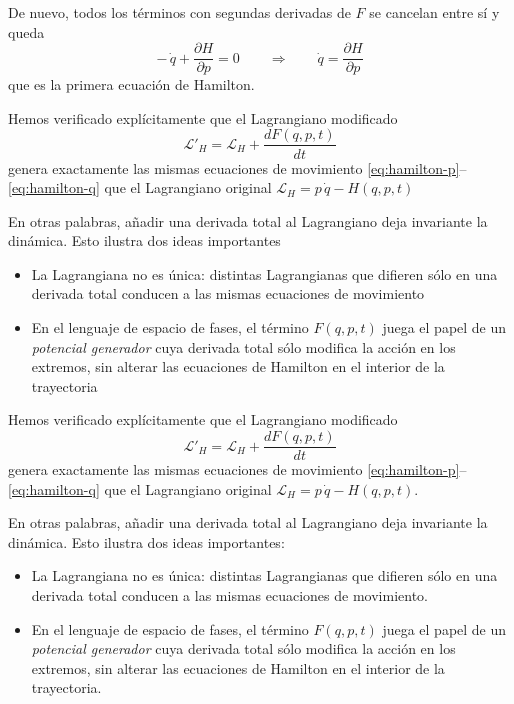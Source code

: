 \documentclass{article}
\begin{document}
De nuevo, todos los términos con segundas derivadas de $F$ se cancelan entre sí
y queda
\begin{equation}
  -\,\dot q + \frac{\partial H}{\partial p} = 0
  \qquad\Rightarrow\qquad
  \dot q = \frac{\partial H}{\partial p}
  \label{eq:hamilton-q}
\end{equation}
que es la primera ecuación de Hamilton.



Hemos verificado explícitamente que el Lagrangiano modificado
\begin{equation}
  \mathcal{L}'_{H}
  = \mathcal{L}_{H}
  + \frac{dF(q,p,t)}{dt}
\end{equation}
genera exactamente las mismas ecuaciones de movimiento
\eqref{eq:hamilton-p}–\eqref{eq:hamilton-q} que el Lagrangiano original
$\mathcal{L}_{H} = p\,\dot q - H(q,p,t)$

En otras palabras, añadir una derivada total al Lagrangiano deja invariante
la dinámica. Esto ilustra dos ideas importantes

\begin{itemize}
  \item[$\bullet$] La Lagrangiana no es única: distintas Lagrangianas que difieren sólo en
        una derivada total conducen a las mismas ecuaciones de movimiento

  \item[$\bullet$] En el lenguaje de espacio de fases, el término $F(q,p,t)$ juega el
        papel de un \emph{potencial generador} cuya derivada total sólo modifica
        la acción en los extremos, sin alterar las ecuaciones de Hamilton en el
        interior de la trayectoria
\end{itemize}

Hemos verificado explícitamente que el Lagrangiano modificado
\begin{equation}
  \mathcal{L}'_{H}
  = \mathcal{L}_{H}
  + \frac{dF(q,p,t)}{dt}
\end{equation}
genera exactamente las mismas ecuaciones de movimiento
\eqref{eq:hamilton-p}–\eqref{eq:hamilton-q} que el Lagrangiano original
$\mathcal{L}_{H} = p\,\dot q - H(q,p,t)$.

En otras palabras, añadir una derivada total al Lagrangiano deja invariante
la dinámica. Esto ilustra dos ideas importantes:

\begin{itemize}
  \item[$\bullet$] La Lagrangiana no es única: distintas Lagrangianas que difieren sólo en
        una derivada total conducen a las mismas ecuaciones de movimiento.

  \item[$\bullet$] En el lenguaje de espacio de fases, el término $F(q,p,t)$ juega el
        papel de un \emph{potencial generador} cuya derivada total sólo modifica
        la acción en los extremos, sin alterar las ecuaciones de Hamilton en el
        interior de la trayectoria.
\end{itemize}
\end{document}
